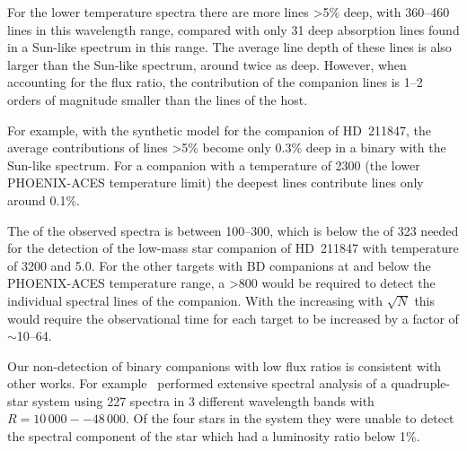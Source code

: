 For the lower temperature spectra there are more lines >5\% deep, with 360--460 lines in this wavelength range, compared with only 31 deep absorption lines found in a Sun-like spectrum in this range.
The average line depth of these lines is also larger than the Sun-like spectrum, around twice as deep.
However, when accounting for the flux ratio, the contribution of the companion lines is 1--2 orders of magnitude smaller than the lines of the host.

For example, with the synthetic model for the companion of {HD~211847}, the average contributions of lines >5\% become only 0.3\% deep in a binary with the Sun-like spectrum.
For a companion with a temperature of 2300\K{} (the lower {PHOENIX-ACES} temperature limit) the deepest lines contribute lines only around 0.1\%.


The \snr{} of the observed spectra is between 100--300, which is below the \snr{} of 323 needed for the detection of the low-mass star companion of {HD~211847} with temperature of 3200\K{} and \Logg{} 5.0.
For the other targets with {BD} companions at and below the {PHOENIX-ACES} temperature range, a \snr{} >800  would be required to detect the individual spectral lines of the companion.
With the \snr{} increasing with \(\sqrt{N}\) this would require the observational time for each target to be increased by a factor of \(\sim\)10--64.

Our non-detection of binary companions with low flux ratios is consistent with other works.
For example~\citet{nemravova_xtauri_2016} performed extensive spectral analysis of a quadruple-star system  using 227 spectra in 3 different wavelength bands with \(R=10\,000--48\,000\).
Of the four stars in the system they were unable to detect the spectral component of the star which had a luminosity ratio below 1\%.




